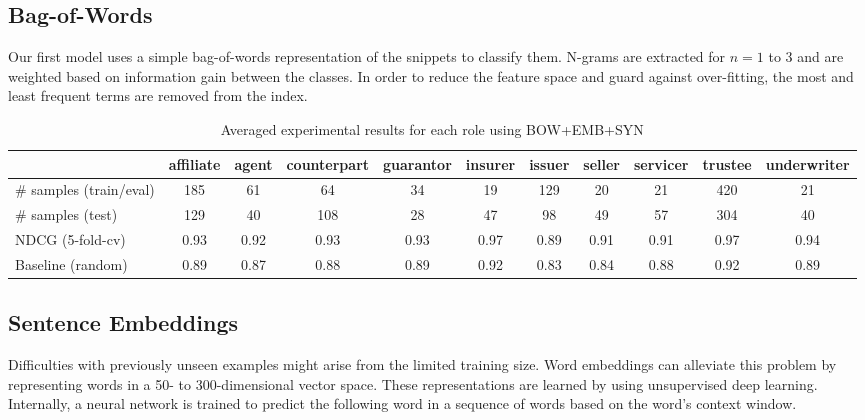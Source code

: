 
\subsection{Bag-of-Words}

Our first model uses a simple bag-of-words representation of the snippets to classify them.
N-grams are extracted for $n=1$ to $3$ and are weighted based on information gain between the classes.
In order to reduce the feature space and guard against over-fitting, the most and least frequent terms are removed from the index.

\begin{table*}[tb]
	\caption{Averaged experimental results for each role using BOW+EMB+SYN}
	\label{tab:roleresults}
	\begin{tabular}{lcccccccccc}
		\toprule
		& affiliate & agent & counterpart & guarantor & insurer & issuer & seller & servicer & trustee & underwriter \\
		\midrule %
               \# samples (train/eval) & 185  & 61   & 64   & 34   & 19   & 129  & 20   & 21   & 420  & 21   \\
               \# samples (test)       & 129  & 40   & 108  & 28   & 47   & 98   & 49   & 57   & 304  & 40   \\
               NDCG (5-fold-cv)        & 0.93 & 0.92 & 0.93 & 0.93 & 0.97 & 0.89 & 0.91 & 0.91 & 0.97 & 0.94  \\
               Baseline (random)       & 0.89 & 0.87 & 0.88 & 0.89 & 0.92 & 0.83 & 0.84 & 0.88 & 0.92 & 0.89 \\
		\bottomrule
	\end{tabular}
\end{table*}

\subsection{Sentence Embeddings}
Difficulties with previously unseen examples might arise from the limited training size.
Word embeddings can alleviate this problem by representing words in a 50- to 300-dimensional vector space.
These representations are learned by using unsupervised deep learning.
Internally, a neural network is trained to predict the following word in a sequence of words based on the word's context window. 

